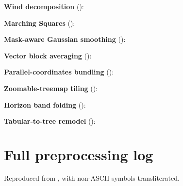 \noindent\textbf{Wind decomposition} ():

\textbf{Marching Squares} ():

\textbf{Mask-aware Gaussian smoothing} ():

\textbf{Vector block averaging} ():

\textbf{Parallel-coordinates bundling} ():

\textbf{Zoomable-treemap tiling} ():

\textbf{Horizon band folding} ():

\textbf{Tabular-to-tree remodel} ():


\section{Full preprocessing log}
\label{app:log}
Reproduced from , with non-ASCII symbols transliterated.

